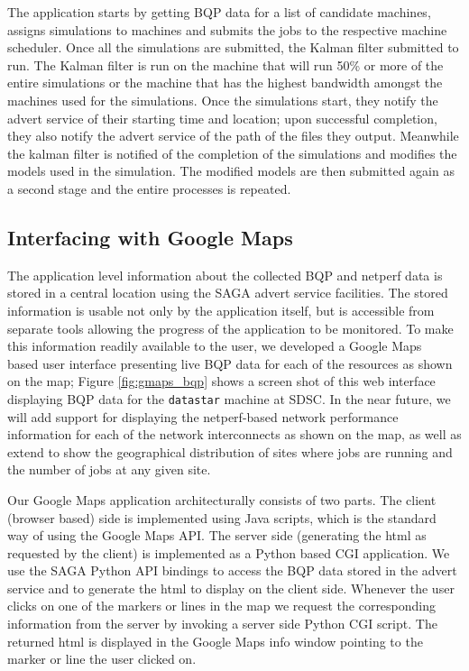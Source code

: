 \documentclass[conference,final]{IEEEtran}
\begin{document}
The application starts by getting BQP data for a list of candidate
machines, assigns simulations to machines and submits the jobs to the
respective machine scheduler. Once all the simulations are submitted,
the Kalman filter submitted to run. The Kalman filter is run on the
machine that will run 50\% or more of the entire simulations or the
machine that has the highest bandwidth amongst the machines used for
the simulations.  Once the simulations start, they notify the advert
service of their starting time and location; upon successful
completion, they also notify the advert service of the path of the
files they output.  Meanwhile the kalman filter is notified of the
completion of the simulations and modifies the models used in the
simulation. The modified models are then submitted again as a second
stage and the entire processes is repeated.

\subsection{Interfacing with Google Maps}

The application level information about the collected BQP and netperf
data is stored in a central location using the SAGA advert service
facilities. The stored information is usable not only by the
application itself, but is accessible from separate tools allowing the
progress of the application to be monitored. To make this information
readily available to the user, we developed a Google
Maps~\cite{google_maps} based user interface presenting live BQP data
for each of the resources as shown on the map; Figure
\ref{fig:gmaps_bqp} shows a screen shot of this web interface
displaying BQP data for the {\tt datastar} machine at SDSC. In the
near future, we will add support for displaying the netperf-based
network performance information for each of the network interconnects
as shown on the map, as well as extend to show the geographical
distribution of sites where jobs are running and the number of jobs at
any given site.

Our Google Maps application architecturally consists of two parts.
The client (browser based) side is implemented using Java scripts,
which is the standard way of using the Google Maps API. The server
side (generating the html as requested by the client) is implemented
as a Python based CGI application. We use the SAGA Python API bindings
to access the BQP data stored in the advert service and to generate
the html to display on the client side. Whenever the user clicks on one of
the markers or lines in the map we request the corresponding
information from the server by invoking a server side Python CGI
script. The returned html is displayed in the Google Maps info window
pointing to the marker or line the user clicked on.
\end{document}
